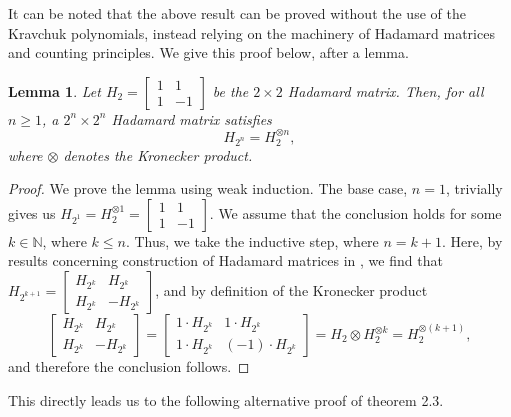 \documentclass[12pt]{amsart}
\numberwithin{figure}{section}
\theoremstyle{plain}
\newtheorem{lemma}[theorem]{Lemma}
\begin{document}
\indent It can be noted that the above result can be proved without the use of the Kravchuk polynomials, instead relying on the machinery of Hadamard matrices and counting principles. We give this proof below, after a lemma.
\begin{lemma}
    Let $H_{2} = \begin{bmatrix}
    1 & 1 \\
    1 & -1
    \end{bmatrix}$ be the $2\times 2$ Hadamard matrix. Then, for all $n\geq 1$, a $2^{n}\times 2^{n}$ Hadamard matrix satisfies
    \[H_{2^{n}} = H_{2}^{\otimes n},\]
    where $\otimes$ denotes the Kronecker product.
\end{lemma}
\begin{proof}
    We prove the lemma using weak induction. The base case, $n=1$, trivially gives us $H_{2^{1}} = H_{2}^{\otimes 1} = \begin{bmatrix}
    1 & 1 \\
    1 & -1
    \end{bmatrix}$. We assume that the conclusion holds for some $k \in \mathbb{N}$, where $k\leq n$. Thus, we take the inductive step, where $n= k+1$. Here, by results concerning construction of Hadamard matrices in \cite{Sylvester1867}, we find that $H_{2^{k+1}} = \begin{bmatrix}
    H_{2^{k}} & H_{2^{k}} \\
    H_{2^{k}} & -H_{2^{k}}
    \end{bmatrix}$, and by definition of the Kronecker product
    \[\begin{bmatrix}
    H_{2^{k}} & H_{2^{k}} \\
    H_{2^{k}} & -H_{2^{k}}
    \end{bmatrix} = \begin{bmatrix}
    1\cdot H_{2^{k}} & 1\cdot H_{2^{k}} \\
    1\cdot H_{2^{k}} & (-1)\cdot H_{2^{k}}
    \end{bmatrix} = H_{2}\otimes H_{2}^{\otimes k} = H_{2}^{\otimes(k+1)},\]
    and therefore the conclusion follows.
\end{proof}
This directly leads us to the following alternative proof of theorem 2.3.
\end{document}
